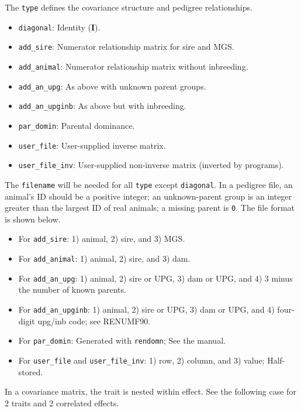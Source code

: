 \documentclass[10pt,landscape]{article}
\begin{document}
\begin{multicols}{3}
The \verb|type| defines the covariance structure and pedigree relationships.

\begin{itemize}[leftmargin=*,itemsep=0pt,parsep=0pt]
  \item \verb|diagonal|: Identity ($\mathbf{I}$).
  \item \verb|add_sire|: Numerator relationship matrix for sire and MGS.
  \item \verb|add_animal|: Numerator relationship matrix without inbreeding.
  \item \verb|add_an_upg|: As above with unknown parent groups.
  \item \verb|add_an_upginb|: As above but with inbreeding.
  \item \verb|par_domin|: Parental dominance.
  \item \verb|user_file|: User-supplied inverse matrix.
  \item \verb|user_file_inv|: User-supplied non-inverse matrix (inverted by programs).
\end{itemize}

The \verb|filename| will be needed for all \verb|type| except \verb|diagonal|.
In a pedigree file, an animal's ID should be a positive integer; an unknown-parent group is an integer greater than the largest ID of real animals; a missing parent is \verb|0|.
The file format is shown below.

\begin{itemize}[leftmargin=*,itemsep=0pt,parsep=0pt]
  \item For \verb|add_sire|: 1) animal, 2) sire, and 3) MGS.
  \item For \verb|add_animal|: 1) animal, 2) sire, and 3) dam.
  \item For \verb|add_an_upg|: 1) animal, 2) sire or UPG, 3) dam or UPG, and 4) 3 minus the number of known parents.
  \item For \verb|add_an_upginb|: 1) animal, 2) sire or UPG, 3) dam or UPG, and 4) four-digit upg/inb code; see RENUMF90.
  \item For \verb|par_domin|: Generated with \verb|rendomn|; See the manual.
  \item For \verb|user_file| and \verb|user_file_inv|: 1) row, 2) column, and 3) value; Half-stored.
\end{itemize}

In a covariance matrix, the trait is nested within effect.
See the following case for 2 traits and 2 correlated effects.


\end{multicols}
\end{document}
